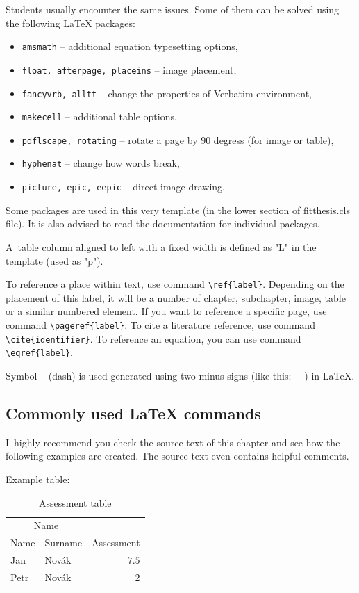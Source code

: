 Students usually encounter the same issues. Some of them can be solved using the following \LaTeX{} packages:

\begin{itemize}
  \item \verb|amsmath| -- additional equation typesetting options,
  \item \verb|float, afterpage, placeins| -- image placement,
  \item \verb|fancyvrb, alltt| -- change the properties of Verbatim environment, 
  \item \verb|makecell| -- additional table options,
  \item \verb|pdflscape, rotating| -- rotate a page by 90 degress (for image or table),
  \item \verb|hyphenat| -- change how words break,
  \item \verb|picture, epic, eepic| -- direct image drawing.
\end{itemize}

Some packages are used in this very template (in the lower section of fitthesis.cls file). It is also advised to read the documentation for individual packages.

A~table column aligned to left with a fixed width is defined as "L" in the template (used as "p").

To reference a place within text, use command \verb|\ref{label}|. Depending on the placement of this label, it will be a number of chapter, subchapter, image, table or a similar numbered element. If you want to reference a specific page, use command \verb|\pageref{label}|. To cite a literature reference, use command \verb|\cite{identifier}|. To reference an equation, you can use command \verb|\eqref{label}|.

Symbol -- (dash) is used generated using two minus signs (like this: \verb|--|) in \LaTeX.

\subsection*{Commonly used \LaTeX{} commands}
\label{sec:Fragments}

I~highly recommend you check the source text of this chapter and see how the following examples are created. The source text even contains helpful comments.


Example table:
\begin{table}[H]
	\vskip6pt
	\caption{Assessment table}
    \vskip6pt
	\centering
	\begin{tabular}{llr}
		\toprule
		\multicolumn{2}{c}{Name} \\
		\cmidrule(r){1-2}
		Name & Surname & Assessment \\
		\midrule
		Jan & Novák & $7.5$ \\
		Petr & Novák & $2$ \\
		\bottomrule
	\end{tabular}
	\label{tab:ExampleTable}
\end{table}

